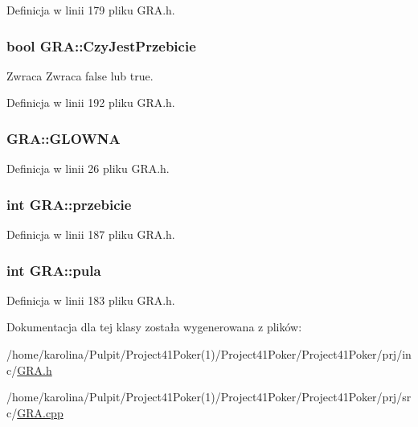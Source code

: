 Definicja w linii 179 pliku G\-R\-A.\-h.

\hypertarget{class_g_r_a_a971a7f0bc74fcd858d40c3f530c5ef5f}{
\subsubsection[{Czy\-Jest\-Przebicie}]{\setlength{\rightskip}{0pt plus 5cm}bool G\-R\-A\-::\-Czy\-Jest\-Przebicie}}\label{class_g_r_a_a971a7f0bc74fcd858d40c3f530c5ef5f}
\begin{DoxyReturn}{Zwraca}
Zwraca false lub true. 
\end{DoxyReturn}


Definicja w linii 192 pliku G\-R\-A.\-h.

\hypertarget{class_g_r_a_a0432480fcbb139f19b413a1bd627b9ce}{
\subsubsection[{G\-L\-O\-W\-N\-A}]{ G\-R\-A\-::\-G\-L\-O\-W\-N\-A\hspace{0.3cm}{\ttfamily [private]}}}\label{class_g_r_a_a0432480fcbb139f19b413a1bd627b9ce}


Definicja w linii 26 pliku G\-R\-A.\-h.

\hypertarget{class_g_r_a_aebea0ee71fa4cacd63c9bb60dadbf926}{
\subsubsection[{przebicie}]{\setlength{\rightskip}{0pt plus 5cm}int G\-R\-A\-::przebicie}}\label{class_g_r_a_aebea0ee71fa4cacd63c9bb60dadbf926}


Definicja w linii 187 pliku G\-R\-A.\-h.

\hypertarget{class_g_r_a_a4df8e87765364f55e3b0200954c0370a}{
\subsubsection[{pula}]{\setlength{\rightskip}{0pt plus 5cm}int G\-R\-A\-::pula}}\label{class_g_r_a_a4df8e87765364f55e3b0200954c0370a}


Definicja w linii 183 pliku G\-R\-A.\-h.



Dokumentacja dla tej klasy została wygenerowana z plików\-:\begin{DoxyCompactItemize}
\item 
/home/karolina/\-Pulpit/\-Project41\-Poker(1)/\-Project41\-Poker/\-Project41\-Poker/prj/inc/\hyperlink{_g_r_a_8h}{G\-R\-A.\-h}\item 
/home/karolina/\-Pulpit/\-Project41\-Poker(1)/\-Project41\-Poker/\-Project41\-Poker/prj/src/\hyperlink{_g_r_a_8cpp}{G\-R\-A.\-cpp}\end{DoxyCompactItemize}
